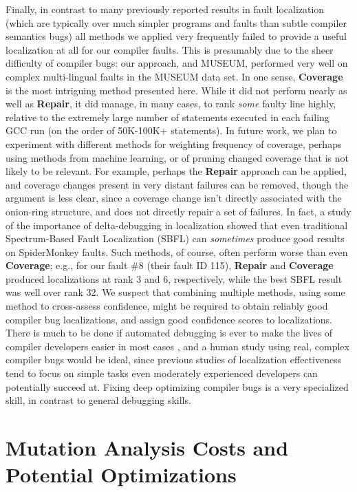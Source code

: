 Finally, in contrast to many previously reported results in fault localization (which are typically over much simpler programs and faults than subtle compiler semantics bugs) all methods we applied very frequently failed to provide a useful localization at all for our compiler faults.  This is presumably due to the sheer difficulty of compiler bugs:  our approach, and MUSEUM, performed very well on complex multi-lingual faults in the MUSEUM data set.  In one sense, {\bf Coverage} is the most intriguing method presented here.  While it did not perform nearly as well as {\bf Repair}, it did manage, in many cases, to rank \emph{some} faulty line highly, relative to the extremely large number of statements executed in each failing GCC run (on the order of 50K-100K+ statements).  In future work, we plan to experiment with different methods for weighting frequency of coverage, perhaps using methods from machine learning, or of pruning changed coverage that is not likely to be relevant.  For example, perhaps the {\bf Repair} approach can be applied, and coverage changes present in very distant failures can be removed, though the argument is less clear, since a coverage change isn't directly associated with the onion-ring structure, and does not directly repair a set of failures.  In fact, a study of the importance of delta-debugging in localization \cite{ReduceLocalize} showed that even traditional Spectrum-Based Fault Localization (SBFL) can \emph{sometimes} produce good results on SpiderMonkey faults.  Such methods, of course, often perform worse than even {\bf Coverage}; e.g., for our fault \#8 (their fault ID 115), {\bf Repair} and {\bf Coverage} produced localizations at rank 3 and 6, respectively, while the best SBFL result was well over rank 32.  We suspect that combining multiple methods, using some method to cross-assess confidence, might be required to obtain reliably good compiler bug localizations, and assign good confidence scores to localizations.  There is much to be done if automated debugging is ever to make the lives of compiler developers easier in most cases \cite{AutoHelp}, and a human study using real, complex compiler bugs would be ideal, since previous studies of localization effectiveness tend to focus on simple tasks even moderately experienced developers can potentially succeed at.  Fixing deep optimizing compiler bugs is a very specialized skill, in contrast to general debugging skills.


\section{Mutation Analysis Costs and Potential Optimizations}
\label{sec:highcost}

